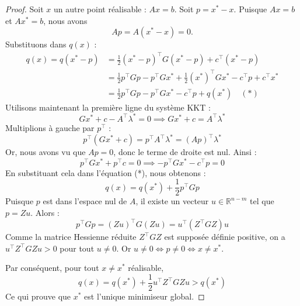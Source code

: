 \begin{proof}
    Soit $x$ un autre point réalisable : $Ax = b$.
    Soit $p = x^* - x$.
    Puisque $Ax = b$ et $Ax^* = b$, nous avons
    \begin{equation}
        Ap = A(x^* - x) = 0.
    \end{equation}
    Substituons dans $q(x)$ :
    \begin{align*}
        q(x) = q(x^* - p) &= \frac{1}{2} (x^* - p)^\top G (x^* - p) + c^\top (x^* - p) \\
                          &= \frac{1}{2} p^\top G p - p^\top G x^* + \frac{1}{2} (x^*)^\top G x^* - c^\top p + c^\top x^* \\
                          &= \frac{1}{2} p^\top G p - p^\top G x^* - c^\top p + q(x^*) \quad (*)
    \end{align*}
    Utilisons maintenant la première ligne du système KKT :
    \begin{equation}
        G x^* + c - A^\top \lambda^* = 0 \implies G x^* + c = A^\top \lambda^*
    \end{equation}
    Multiplions à gauche par $p^\top$ :
    \begin{equation}
        p^\top (G x^* + c) = p^\top A^\top \lambda^* = (Ap)^\top \lambda^*
    \end{equation}
    Or, nous avons vu que $Ap = 0$, donc le terme de droite est nul. Ainsi :
    \begin{equation}
        p^\top G x^* + p^\top c = 0 \implies -p^\top G x^* - c^\top p = 0
    \end{equation}
    En substituant cela dans l'équation (*), nous obtenons :
    \begin{equation}
        q(x) = q(x^*) + \frac{1}{2} p^\top G p
    \end{equation}
    Puisque $p$ est dans l'espace nul de $A$, il existe un vecteur $u \in \mathbb{R}^{n-m}$ tel que $p = Zu$. Alors :
    \begin{equation}
        p^\top G p = (Zu)^\top G (Zu) = u^\top (Z^\top G Z) u
    \end{equation}
    Comme la matrice Hessienne réduite $Z^\top G Z$ est supposée définie positive, on a $u^\top Z^\top G Z u > 0$ pour tout $u \neq 0$.
    Or $u \neq 0 \iff p \neq 0 \iff x \neq x^*$.
    
    Par conséquent, pour tout $x \neq x^*$ réalisable,
    \begin{equation}
        q(x) = q(x^*) + \frac{1}{2} u^\top Z^\top G Z u > q(x^*)
    \end{equation}
    Ce qui prouve que $x^*$ est l'unique minimiseur global.
\end{proof}


